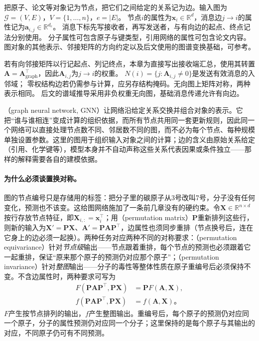 把原子、论文等对象记为节点，把它们之间给定的关系记为边。输入图为$\mathcal G=(V,E)$，$V=\{1,\ldots,n\}$，$e=|E|$。
节点$i$的属性为$\bm x_i\in\mathbb R^d$，消息边$j\to i$的属性记为$\bm a_{i,j}\in\mathbb R^{d_e}$。
消息下标先写接收者，再写发送者，与有向边的起点、终点记法分别使用。
分子属性可包含原子与键类型，引用网络的属性可包含论文内容。图对象的其他表示、邻接矩阵的方向约定以及后文使用的图谱变换基础，可参考。

若有向邻接矩阵以行记起点、列记终点，本章为直接写出接收端汇总，使用其转置
$\bm A=\bm A_{\mathrm{graph}}^\top$，因此$\bm A_{i,j}$为$j\to i$的权重。
$N(i)=\{j:\bm A_{i,j}\ne0\}$是发送有效消息的入邻域；
零权结构边若仍需参与计算，应另存结构掩码。无向图上矩阵对称，两种表示相同。
后文的谱域推导采用非负权重无向图，基础消息传递允许有向边。

（graph neural network, GNN）让网络沿给定关系交换并组合对象的表示。它把“谁与谁相连”变成计算的组织依据，而所有节点共用同一套更新规则，因此同一个网络可以直接处理节点数不同、邻居数不同的图，而不必为每个节点、每种规模单独设置参数。这里的图用于组织输入对象之间的计算；边的含义由原始关系给定（引用、化学键等），模型本身并不自动声称这些关系代表因果或条件独立——那样的解释需要各自的建模依据。

\paragraph{为什么必须谈置换对称。}
图的节点编号只是存储用的标签：把分子里的碳原子从3号改叫7号，分子没有任何变化，预测也不该变。这给图网络施加了一条前几章没有的硬约束。令$\bm{X}\in\mathbb{R}^{n\times d}$按行存放节点特征，即$\bm{X}_{i,:}=\bm{x}_i^{\top}$；用（permutation matrix）$\bm{P}$重新排列这些行，则新的输入为$\bm{X}'=\bm{P}\bm{X}$、$\bm{A}'=\bm{P}\bm{A}\bm{P}^{\top}$，边属性也须同步重排（节点换号后，连在它身上的边必须一起换）。两种任务对应两种不同的对称要求：（permutation equivariance）针对\emph{节点级}输出——节点跟着重排，每个节点的预测也必须跟着它一起重排，保证“原来那个原子的预测仍对应那个原子”；（permutation invariance）针对\emph{整图}输出——分子的毒性等整体性质在原子重编号后必须保持不变。不含边属性时，两种要求可写为
\begin{equation}
  \begin{aligned}
    F(\bm{P}\bm{A}\bm{P}^{\top},\bm{P}\bm{X})
      &=\bm{P}F(\bm{A},\bm{X}),\\
    f(\bm{P}\bm{A}\bm{P}^{\top},\bm{P}\bm{X})
      &=f(\bm{A},\bm{X})\text{。}
  \end{aligned}
  \label{eq:gnn-permutation}
\end{equation}
$F$产生按节点排列的输出，$f$产生整图输出。重编号后，每个原子的预测仍对应同一个原子，分子的属性预测仍对应同一个分子；这里保持的是每个原子与其输出的对应，不同原子仍可有不同预测。

